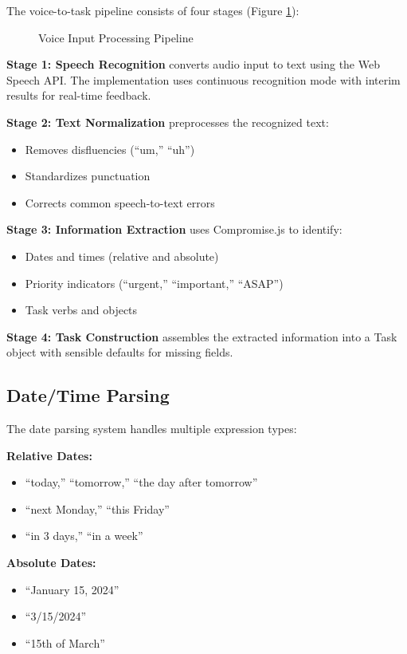 The voice-to-task pipeline consists of four stages (Figure \ref{fig:nlp-pipeline}):

\begin{figure}[htbp]
    \centering
    \caption{Voice Input Processing Pipeline}
    \label{fig:nlp-pipeline}
\end{figure}

\textbf{Stage 1: Speech Recognition} converts audio input to text using the Web Speech API. The implementation uses continuous recognition mode with interim results for real-time feedback.

\textbf{Stage 2: Text Normalization} preprocesses the recognized text:
\begin{itemize}
    \item Removes disfluencies (``um,'' ``uh'')
    \item Standardizes punctuation
    \item Corrects common speech-to-text errors
\end{itemize}

\textbf{Stage 3: Information Extraction} uses Compromise.js to identify:
\begin{itemize}
    \item Dates and times (relative and absolute)
    \item Priority indicators (``urgent,'' ``important,'' ``ASAP'')
    \item Task verbs and objects
\end{itemize}

\textbf{Stage 4: Task Construction} assembles the extracted information into a Task object with sensible defaults for missing fields.

\subsection{Date/Time Parsing}

The date parsing system handles multiple expression types:

\textbf{Relative Dates:}
\begin{itemize}
    \item ``today,'' ``tomorrow,'' ``the day after tomorrow''
    \item ``next Monday,'' ``this Friday''
    \item ``in 3 days,'' ``in a week''
\end{itemize}

\textbf{Absolute Dates:}
\begin{itemize}
    \item ``January 15, 2024''
    \item ``3/15/2024''
    \item ``15th of March''
\end{itemize}

